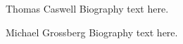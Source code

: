 \documentclass[10pt,journal,compsoc]{IEEEtran}
\theoremstyle{definition}
\theoremstyle{remark}
\begin{document}
\begin{IEEEbiographynophoto}{Thomas Caswell}
  Biography text here.
\end{IEEEbiographynophoto}

\begin{IEEEbiographynophoto}{Michael Grossberg}
Biography text here.
\end{IEEEbiographynophoto}




\end{document}
